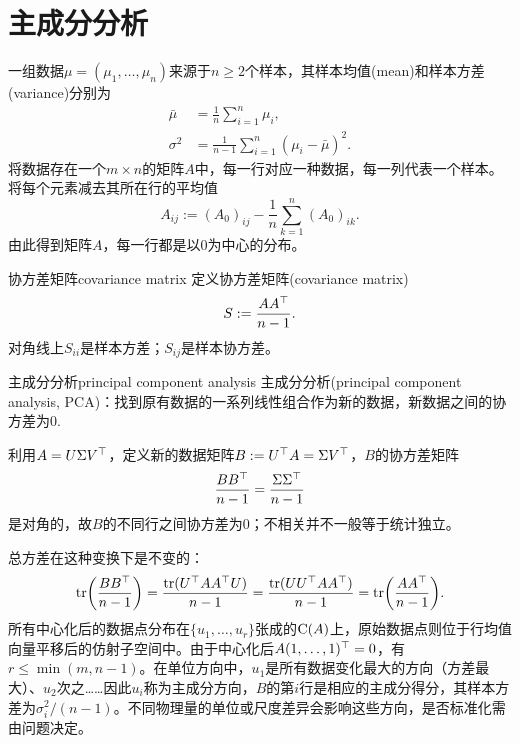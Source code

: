 \section{主成分分析}
一组数据$\mu = (\mu_1,\ldots,\mu_n)$来源于$n \geq 2$个样本，其样本均值(mean)和样本方差(variance)分别为
\begin{subequations}\label{eq:la-sample-moments}
	\begin{align}
		\bar\mu &= \frac1n\sum_{i=1}^n\mu_i,\\
		\sigma^2 &= \frac1{n - 1}\sum_{i=1}^n(\mu_i - \bar\mu)^2.
	\end{align}
\end{subequations}
将数据存在一个$m \times n$的矩阵$A$中，每一行对应一种数据，每一列代表一个样本。将每个元素减去其所在行的平均值
\begin{equation}\label{eq:la-centered-data}
	A_{ij} := (A_0)_{ij} - \frac1n\sum_{k=1}^n(A_0)_{ik}.
\end{equation}
由此得到矩阵$A$，每一行都是以0为中心的分布。
\begin{definition}{协方差矩阵}{covariance matrix}
	定义协方差矩阵(covariance matrix)
	\begin{equation}
		S := \frac{AA^\top}{n - 1}.
	\end{equation}
	对角线上$S_{ii}$是样本方差；$S_{ij}$是样本协方差。
\end{definition}
\begin{method}{主成分分析}{principal component analysis}
	主成分分析(principal component analysis, PCA)：找到原有数据的一系列线性组合作为新的数据，新数据之间的协方差为0.
\end{method}
利用$A = U\Sigma V^\top$，定义新的数据矩阵$B := U^\top A = \Sigma V^\top$，$B$的协方差矩阵
\begin{equation}\label{eq:la-principal-component-variances}
	\frac{BB^\top}{n - 1} = \frac{\Sigma\Sigma^\top}{n - 1}
\end{equation}
是对角的，故$B$的不同行之间协方差为0；不相关并不一般等于统计独立。

总方差在这种变换下是不变的：
\[
	\operatorname{tr}\biggl(\frac{BB^\top}{n - 1}\biggr) = \frac{\operatorname{tr}(U^\top AA^\top U)}{n - 1} = \frac{\operatorname{tr}(UU^\top AA^\top)}{n - 1} = \operatorname{tr}\biggl(\frac{AA^\top}{n - 1}\biggr).
\]
所有中心化后的数据点分布在$\{u_1,\ldots,u_r\}$张成的$\operatorname{C}(A)$上，原始数据点则位于行均值向量平移后的仿射子空间中。由于中心化后$A(1,\ldots,1)^\top = 0$，有$r \leq \min(m,n - 1)$。在单位方向中，$u_1$是所有数据变化最大的方向（方差最大）、$u_2$次之……因此$u_i$称为主成分方向，$B$的第$i$行是相应的主成分得分，其样本方差为$\sigma_i^2/(n - 1)$。不同物理量的单位或尺度差异会影响这些方向，是否标准化需由问题决定。
